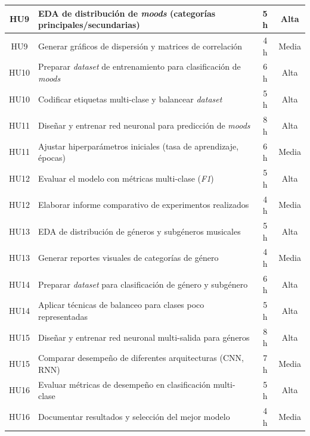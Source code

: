 \documentclass[
11pt, %
]{charter}
\begin{document}
\begin{table}[htpb]
\begin{tabularx}{\linewidth}{@{}|c|X|c|c|@{}}
HU9 & EDA de distribución de \textit{moods} (categorías principales/secundarias) & 5 h & Alta \\ \hline
HU9 & Generar gráficos de dispersión y matrices de correlación & 4 h & Media \\ \hline

HU10 & Preparar \textit{dataset} de entrenamiento para clasificación de \textit{moods} & 6 h & Alta \\ \hline
HU10 & Codificar etiquetas multi-clase y balancear \textit{dataset} & 5 h & Alta \\ \hline

HU11 & Diseñar y entrenar red neuronal para predicción de \textit{moods} & 8 h & Alta \\ \hline
HU11 & Ajustar hiperparámetros iniciales (tasa de aprendizaje, épocas) & 6 h & Media \\ \hline

HU12 & Evaluar el modelo con métricas multi-clase (\textit{F1}) & 5 h & Alta \\ \hline
HU12 & Elaborar informe comparativo de experimentos realizados & 4 h & Media \\ \hline

HU13 & EDA de distribución de géneros y subgéneros musicales & 5 h & Alta \\ \hline
HU13 & Generar reportes visuales de categorías de género & 4 h & Media \\ \hline

HU14 & Preparar \textit{dataset} para clasificación de género y subgénero & 6 h & Alta \\ \hline
HU14 & Aplicar técnicas de balanceo para clases poco representadas & 5 h & Alta \\ \hline

HU15 & Diseñar y entrenar red neuronal multi-salida para géneros & 8 h & Alta \\ \hline
HU15 & Comparar desempeño de diferentes arquitecturas (CNN, RNN) & 7 h & Media \\ \hline

HU16 & Evaluar métricas de desempeño en clasificación multi-clase & 5 h & Alta \\ \hline
HU16 & Documentar resultados y selección del mejor modelo & 4 h & Media \\ \hline

\end{tabularx}
\end{table}
\end{document}
